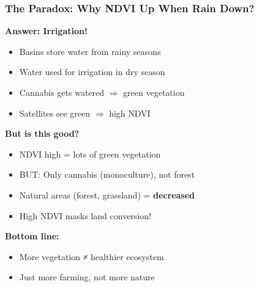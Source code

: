 \documentclass{beamer}
\begin{document}

\begin{frame}
\frametitle{The Paradox: Why NDVI Up When Rain Down?}

\textbf{Answer: Irrigation!}
\begin{itemize}
  \item Basins store water from rainy seasons
  \item Water used for irrigation in dry season
  \item Cannabis gets watered $\Rightarrow$ green vegetation
  \item Satellites see green $\Rightarrow$ high NDVI
\end{itemize}

\vspace{0.3cm}

\textbf{But is this good?}
\begin{itemize}
  \item NDVI high = lots of green vegetation
  \item BUT: Only cannabis (monoculture), not forest
  \item Natural areas (forest, grassland) = \textbf{decreased}
  \item High NDVI masks land conversion!
\end{itemize}

\vspace{0.3cm}

\textbf{Bottom line:}
\begin{itemize}
  \item More vegetation ≠ healthier ecosystem
  \item Just more farming, not more nature
\end{itemize}

\end{frame}
\end{document}
